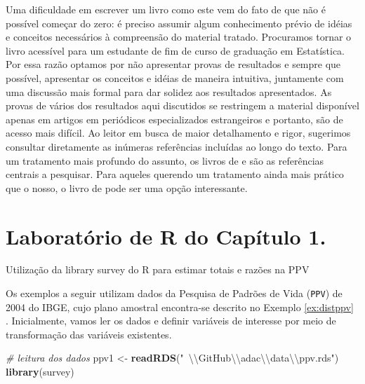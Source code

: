 \documentclass[]{book}
\newenvironment{Shaded}{\begin{snugshade}}{\end{snugshade}}
\newcommand{\KeywordTok}[1]{\textcolor[rgb]{0.13,0.29,0.53}{\textbf{{#1}}}}
\newcommand{\CharTok}[1]{\textcolor[rgb]{0.31,0.60,0.02}{{#1}}}
\newcommand{\StringTok}[1]{\textcolor[rgb]{0.31,0.60,0.02}{{#1}}}
\newcommand{\CommentTok}[1]{\textcolor[rgb]{0.56,0.35,0.01}{\textit{{#1}}}}
\newcommand{\NormalTok}[1]{{#1}}
\numberwithin{example}{chapter}
\numberwithin{remark}{chapter}
\numberwithin{definition}{chapter}
\let\BeginKnitrBlock\begin \let\EndKnitrBlock\end
\begin{document}
Uma dificuldade em escrever um livro como este vem do fato de que não é
possível começar do zero: é preciso assumir algum conhecimento prévio de
idéias e conceitos necessários à compreensão do material tratado.
Procuramos tornar o livro acessível para um estudante de fim de curso de
graduação em Estatística. Por essa razão optamos por não apresentar
provas de resultados e sempre que possível, apresentar os conceitos e
idéias de maneira intuitiva, juntamente com uma discussão mais formal
para dar solidez aos resultados apresentados. As provas de vários dos
resultados aqui discutidos se restringem a material disponível apenas em
artigos em periódicos especializados estrangeiros e portanto, são de
acesso mais difícil. Ao leitor em busca de maior detalhamento e rigor,
sugerimos consultar diretamente as inúmeras referências incluídas ao
longo do texto. Para um tratamento mais profundo do assunto, os livros
de \citep{SHS89} e \citep{CHSK2003} são as referências centrais a
pesquisar. Para aqueles querendo um tratamento ainda mais prático que o
nosso, o livro de \citep{lethonen} pode ser uma opção interessante.

\section{Laboratório de R do Capítulo 1.}\label{epa}

\BeginKnitrBlock{example}
\protect\hypertarget{ex:unnamed-chunk-1}{}{\label{ex:unnamed-chunk-1}}Utilização
da library survey do R para estimar totais e razões na PPV
\EndKnitrBlock{example} Os exemplos a seguir utilizam dados da Pesquisa
de Padrões de Vida (\texttt{PPV}) de 2004 do IBGE, cujo plano amostral
encontra-se descrito no Exemplo \ref{ex:distppv} . Inicialmente, vamos
ler os dados e definir variáveis de interesse por meio de transformação
das variáveis existentes.

\begin{Shaded}
\begin{Highlighting}[]
\CommentTok{# leitura dos dados}
\NormalTok{ppv1 <-}\StringTok{ }\KeywordTok{readRDS}\NormalTok{(}\StringTok{"~}\CharTok{\textbackslash{}\textbackslash{}}\StringTok{GitHub}\CharTok{\textbackslash{}\textbackslash{}}\StringTok{adac}\CharTok{\textbackslash{}\textbackslash{}}\StringTok{data}\CharTok{\textbackslash{}\textbackslash{}}\StringTok{ppv.rds"}\NormalTok{)}
\KeywordTok{library}\NormalTok{(survey)}
\end{Highlighting}
\end{Shaded}
\end{document}
